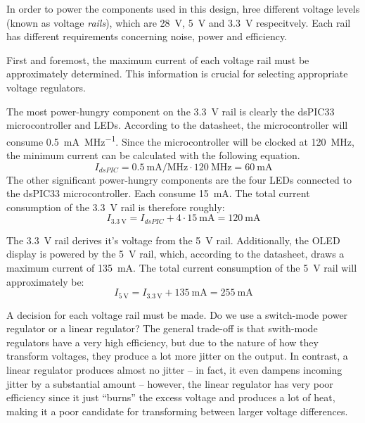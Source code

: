 \label{sec:voltage_rails}

In order to power the components used  in  this  design,  hree different voltage
levels (known as voltage \emph{rails}), which are  \SI{28}{\volt}, \SI{5}{\volt}
and   \SI{3.3}{\volt}   respecitvely.  Each  rail  has  different   requirements
concerning noise, power and efficiency.

First  and  foremost,  the  maximum  current  of  each   voltage  rail  must  be
approximately determined. This information is crucial for  selecting appropriate
voltage regulators.

The most  power-hungry  component  on  the  \SI{3.3}{\volt}  rail is clearly the
dsPIC33   microcontroller   and  LEDs.   According   to   the   datasheet,   the
microcontroller will  consume  \SI{0.5}{\milli\ampere\per\mega\hertz}. Since the
microcontroller will be clocked  at  \SI{120}{\mega\hertz},  the minimum current
can be calculated with the following equation.
\begin{equation}
    I_{dsPIC} = \SI{0.5}{\milli\ampere\per\mega\hertz} \cdot \SI{120}{\mega\hertz} = \SI{60}{\milli\ampere}
\end{equation}
The other significant power-hungry components are the four LEDs connected to the
dsPIC33 microcontroller. Each consume \SI{15}{\milli\ampere}. The total  current
consumption of the \SI{3.3}{\volt} rail is therefore roughly:
\begin{equation}
    I_{\SI{3.3}{\volt}} = I_{dsPIC} + 4 \cdot \SI{15}{\milli\ampere} = \SI{120}{\milli\ampere}
\end{equation}

The \SI{3.3}{\volt} rail  derives  it's  voltage  from  the  \SI{5}{\volt} rail.
Additionally,  the OLED display is powered by  the  \SI{5}{\volt}  rail,  which,
according to the datasheet, draws a maximum  current of \SI{135}{\milli\ampere}.
The total  current  consumption of the \SI{5}{\volt} rail will approximately be:
\begin{equation}
    I_{\SI{5}{\volt}} = I_{\SI{3.3}{\volt}} + \SI{135}{\milli\ampere} = \SI{255}{\milli\ampere}
\end{equation}

A  decision  for  each  voltage rail must be made. Do we use a switch-mode power
regulator  or a linear regulator?  The  general  trade-off  is  that  swith-mode
regulators have  a  very  high  efficiency,  but  due  to the nature of how they
transform voltages, they produce a lot more jitter on the output. In contrast, a
linear regulator produces almost  no jitter -- in fact, it even dampens incoming
jitter  by  a substantial amount -- however, the linear regulator has very  poor
efficiency since  it  just  ``burns''  the  excess voltage and produces a lot of
heat,  making  it  a  poor  candidate  for transforming between  larger  voltage
differences.

